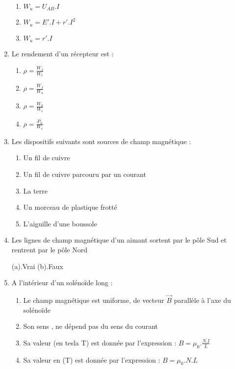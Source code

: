 \documentclass[12pt]{article}
\begin{document}
\begin{multicols}{2}
\begin{enumerate}
\begin{enumerate}
				\item $W_u=U_{AB}.I$
				\item $W_u=E'.I+  r'.I^2$
				\item $W_u=r'.I$
			\end{enumerate}
		\item Le rendement d’un récepteur est :
			\begin{enumerate}
				\item $\rho = \frac{W_J}{W_e}$
				\item $\rho = \frac{W_J}{W_u}$
				\item $\rho = \frac{W_u}{W_e}$
				\item $\rho = \frac{P_u}{W_e}$
			\end{enumerate}
		\item Les dispositifs suivants sont sources de champ magnétique :
			\begin{enumerate}
				\item Un fil de cuivre
				\item Un fil de cuivre parcouru par un courant
				\item La terre
				\item Un morceau de plastique frotté
				\item L’aiguille d’une boussole
			\end{enumerate}
		\item Les lignes de champ magnétique d’un aimant sortent par le pôle Sud et rentrent par le pôle Nord
		
			(a).Vrai \hspace{1cm} (b).Faux

\vspace{3cm}
		\item A l’intérieur d’un solénoïde long :
			\begin{enumerate}
				\item Le champ magnétique est uniforme, de vecteur $\vec{B}$ parallèle à l’axe du solénoïde
				\item Son sens , ne dépend pas du sens du courant
				\item Sa valeur (en tesla T) est donnée par l’expression : $B = \mu_0.\frac{N.I}{L}$ 
				\item Sa valeur en (T) est donnée par l’expression : $B = \mu_0.N.L$
			\end{enumerate}

	\end{enumerate}
\end{multicols}

\end{document}
